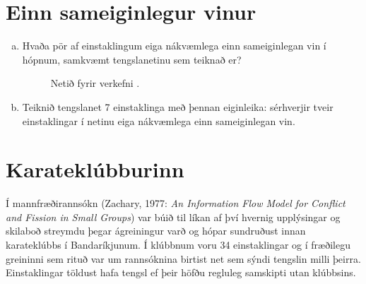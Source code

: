 \documentclass[b5paper,12pt]{book}
\renewcommand*\thesection{\arabic{section}}
\begin{document}
\section{Einn sameiginlegur vinur}
\begin{enumerate}[(a)]
\item Hvaða pör af einstaklingum eiga nákvæmlega einn sameiginlegan vin í hópnum, samkvæmt tengslanetinu sem teiknað er?

\begin{figure}[h]
    \centering
{}
\caption*{Netið fyrir verkefni \thesection{}.}
\end{figure}
\item Teiknið tengslanet 7 einstaklinga með þennan eiginleika: sérhverjir tveir einstaklingar í netinu eiga nákvæmlega einn sameiginlegan vin.
\end{enumerate}

\section{Karateklúbburinn}
Í mannfræðirannsókn (Zachary, 1977: \textit{An Information Flow Model for Conflict and Fission in Small Groups}) var búið til líkan af því hvernig upplýsingar og skilaboð streymdu þegar ágreiningur varð og hópar sundruðust innan karateklúbbs í Bandaríkjunum. Í klúbbnum voru 34 einstaklingar og í fræðilegu greininni sem rituð var um rannsóknina birtist net sem sýndi tengslin milli þeirra. Einstaklingar töldust hafa tengsl ef þeir höfðu regluleg samskipti utan klúbbsins.  
\end{document}
